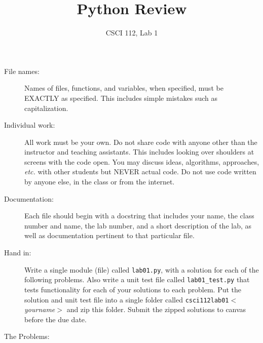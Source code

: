 \documentclass{article}
\title{Python Review}
\author{CSCI 112, Lab 1}
\date{}
\begin{document}
\sloppy

\maketitle

\begin{description} 
\item[File names:]  Names of files, functions, and variables, 
when specified,
must be EXACTLY as specified.  This includes simple mistakes such
as capitalization.

\item[Individual work:]  All work must be your own.  Do not share
code with anyone other than the instructor and teaching assistants.
This includes looking over shoulders at screens with the code open.
You may discuss ideas, algorithms, approaches, {\em etc.} with
other students but NEVER actual code.  Do not use code
written by anyone else, in the class or from the internet.

\item[Documentation:] Each file should begin with a docstring
that includes your name, the class number and name, the lab
number, and  
a short description of the lab, as well as documentation pertinent
to that particular file.

\item[Hand in:]  Write a single module (file) called {\tt lab01.py},
with a solution for each of the following problems.  Also write a unit test
file called {\tt lab01\_test.py}
 that tests functionality for each of your solutions to each problem.
Put the solution and unit test file
into a single folder called {{\tt csci112lab01}$<$\sl yourname$>$} and zip this folder.
Submit the zipped solutions to canvas before the due date.

\item[The Problems:]
\end{description}
\end{document}
